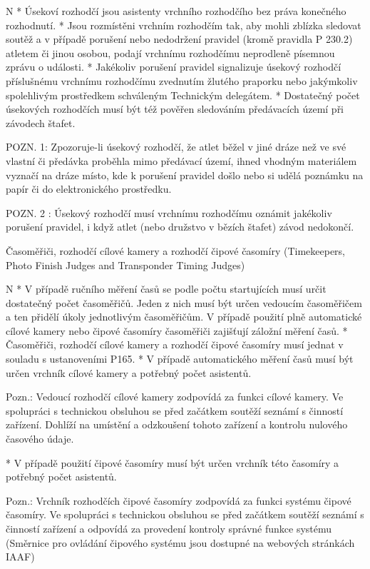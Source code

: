\begitems \style N
* Úsekoví rozhodčí jsou asistenty vrchního rozhodčího bez práva konečného rozhodnutí.
* Jsou rozmístěni vrchním rozhodčím tak, aby mohli zblízka sledovat soutěž a v případě porušení nebo nedodržení pravidel (kromě pravidla P 230.2) atletem či jinou osobou, podají vrchnímu rozhodčímu neprodleně písemnou zprávu o události.
* Jakékoliv porušení pravidel signalizuje úsekový rozhodčí příslušnému vrchnímu rozhodčímu zvednutím žlutého praporku nebo jakýmkoliv spolehlivým prostředkem schváleným Technickým delegátem.
* Dostatečný počet úsekových rozhodčích musí být též pověřen sledováním předávacích území při závodech štafet.
\enditems

POZN. 1: Zpozoruje-li úsekový rozhodčí, že atlet běžel v jiné dráze než ve své vlastní či předávka proběhla mimo předávací území, ihned vhodným materiálem vyznačí na dráze místo, kde k porušení pravidel došlo nebo si udělá poznámku na papír či do elektronického prostředku.

POZN. 2 : Úsekový rozhodčí musí vrchnímu rozhodčímu oznámit jakékoliv porušení pravidel, i když atlet (nebo družstvo v bězích štafet) závod nedokončí.

\secc Časoměřiči, rozhodčí cílové kamery a rozhodčí čipové časomíry (Timekeepers, Photo Finish Judges and Transponder Timing Judges)

\begitems \style N
* V případě ručního měření časů se podle počtu startujících musí určit dostatečný počet časoměřičů. Jeden z nich musí být určen vedoucím časoměřičem a ten přidělí úkoly jednotlivým časoměřičům. V případě použití plně automatické cílové kamery nebo čipové časomíry časoměřiči zajišťují záložní měření časů.
* Časoměřiči, rozhodčí cílové kamery a rozhodčí čipové časomíry musí jednat v souladu s ustanoveními P165.
* V případě automatického měření časů musí být určen vrchník cílové kamery a potřebný počet asistentů.

Pozn.: Vedoucí rozhodčí cílové kamery zodpovídá za funkci cílové kamery. Ve spolupráci s technickou obsluhou se před začátkem soutěží seznámí s činností zařízení. Dohlíží na umístění a odzkoušení tohoto zařízení a kontrolu nulového časového údaje.

* V případě použití čipové časomíry musí být určen vrchník této časomíry a potřebný počet asistentů.

Pozn.: Vrchník rozhodčích čipové časomíry zodpovídá za funkci systému čipové časomíry. Ve spolupráci s technickou obsluhou se před začátkem soutěží seznámí s činností zařízení a odpovídá za provedení kontroly správné funkce systému (Směrnice pro ovládání čipového systému jsou dostupné na webových stránkách IAAF)
\enditems

